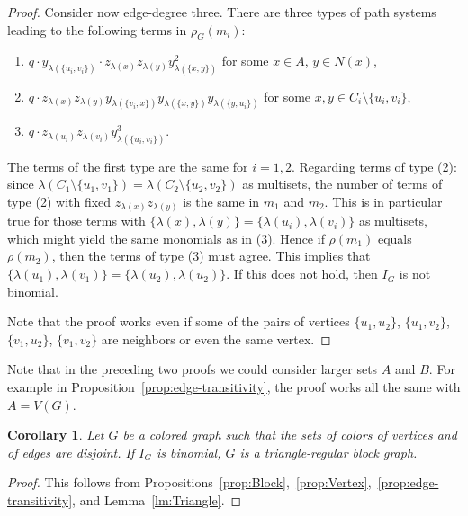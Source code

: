 \documentclass[a4paper, 11pt]{amsart}
\numberwithin{theorem}{section}
\newtheorem{corollary}[theorem]{Corollary}
\begin{document}
\begin{proof}
    Consider now edge-degree three. There are three types of path
    systems leading to the following terms in $\rho_G(m_i)$:
    \begin{enumerate}
        \item $q\cdot y_{\lambda(\{u_i,v_i\})}\cdot
	z_{\lambda(x)}z_{\lambda(y)}y_{\lambda(\{x,y\})}^2$ for some $x\in A$, $y\in N(x)$,
        \item $q\cdot
	z_{\lambda(x)}z_{\lambda(y)}y_{\lambda(\{v_i,x\})}y_{\lambda(\{x,y\})}
	y_{\lambda(\{y,u_i\})}$ for some $x,y\in C_i\setminus \lbrace u_i,v_i\rbrace$,
        \item $q\cdot
	z_{\lambda(u_i)}z_{\lambda(v_i)}y_{\lambda(\{u_i,v_i\})}^3$.
    \end{enumerate}

    The terms of the first type are the same for $i=1,2$. Regarding terms
    of type (2): since $\lambda(C_1\setminus\lbrace u_1,v_1\rbrace) =
    \lambda(C_2\setminus\lbrace u_2,v_2\rbrace)$ as multisets, the number
    of terms of type (2) with fixed $z_{\lambda(x)}z_{\lambda(y)}$ is the
    same in $m_1$ and $m_2$. This is in particular true for those terms
    with $\{\lambda(x),\lambda(y)\}=\{\lambda(u_i),\lambda(v_i)\}$
    as multisets, which might yield the same monomials
    as in (3).  Hence if $\rho(m_1)$ equals $\rho(m_2)$,
    then the terms of type (3) must agree. This implies that
    $\{\lambda(u_1),\lambda(v_1)\}=\{\lambda(u_2),\lambda(u_2)\}$. If
    this does not hold, then $I_G$ is not binomial.

    Note that the proof works even if some of the pairs of vertices $\{u_1, u_2\}$, $\{u_1,v_2\}$, $\{v_1,u_2\}$, $\{v_1,v_2\}$ are neighbors or even the same vertex.
\end{proof}

Note that in the preceding two proofs we could consider larger sets $A$ and $B$. For example in Proposition~\ref{prop:edge-transitivity}, the proof works all the same with $A = V(G)$.

\begin{corollary}
    Let $G$ be a colored graph such that the sets of colors of
    vertices and of edges are disjoint. If $I_G$ is binomial, $G$ is a triangle-regular block graph.
\end{corollary}

\begin{proof}
This follows from
Propositions~\ref{prop:Block},~\ref{prop:Vertex},~\ref{prop:edge-transitivity},
and Lemma~\ref{lm:Triangle}.
\end{proof}
\end{document}
